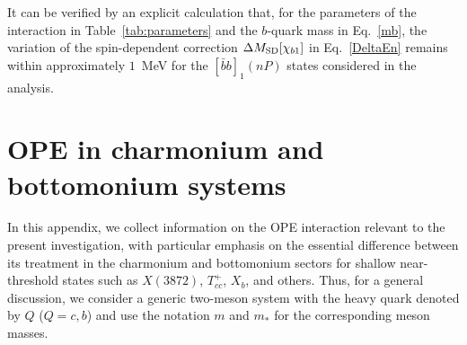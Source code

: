 \documentclass[aps,prd,showpacs,amsmath,twocolumn,superscriptaddress,floatfix,nofootinbib,notitlepage]{revtex4-2}
\newcommand{\bbnP}{[\bar{b}b]_1(nP)}
\newcommand{\X}{X(3872)}
\newcommand{\Xb}{X_b}
\begin{document}
It can be verified by an explicit calculation that, for the parameters of the interaction in Table~\ref{tab:parameters} and the $b$-quark mass in Eq.~\eqref{mb}, the variation of the spin-dependent correction $\Delta M_{\rm SD}[\chi_{b1}]$ in Eq.~\eqref{DeltaEn} remains within approximately $1$~MeV for the $\bbnP$ states considered in the analysis. 

\section{OPE in charmonium and bottomonium systems}
\label{app:OPE}

In this appendix, we collect information on the OPE interaction relevant to the present investigation, with particular emphasis on the essential difference between its treatment in the charmonium and bottomonium sectors for shallow near-threshold states such as $\X$, $T_{cc}^+$, $\Xb$, and others. Thus, for a general discussion, we consider a generic two-meson system with the heavy quark denoted by $Q$ ($Q=c,b$) and use the notation $m$ and $m_*$ for the corresponding meson masses.
\end{document}
